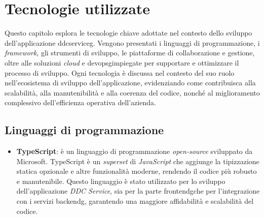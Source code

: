 \chapter{Tecnologie utilizzate}
\label{chap:tecnologie_utilizzate}
Questo capitolo esplora le tecnologie chiave adottate nel contesto dello sviluppo dell'applicazione \gls{ddcserviceg}\glox.
Vengono presentati i linguaggi di programmazione, i \textit{framework}, gli strumenti di sviluppo, le piattaforme di collaborazione e gestione, oltre alle soluzioni \textit{cloud} e \gls{devopsg}\glox impiegate per supportare e ottimizzare il processo di sviluppo.
Ogni tecnologia è discussa nel contesto del suo ruolo nell'ecosistema di sviluppo dell'applicazione, evidenziando come contribuisca alla scalabilità, alla manutenibilità e alla coerenza del codice, nonché al miglioramento complessivo dell'efficienza operativa dell'azienda.
\section{Linguaggi di programmazione}
\begin{itemize}
    \item \textbf{TypeScript}: è un linguaggio di programmazione \textit{open-source} sviluppato da Microsoft.
    TypeScript è un \textit{superset} di \textit{JavaScript} che aggiunge la tipizzazione statica opzionale e altre funzionalità moderne, rendendo il codice più robusto e manutenibile. 
    Questo linguaggio è stato utilizzato per lo sviluppo dell'applicazione \textit{DDC Service}, sia per la parte \gls{frontendg}\glox che per l'integrazione con i servizi \gls{backendg}\glox, garantendo una maggiore affidabilità e scalabilità del codice.
\end{itemize}

